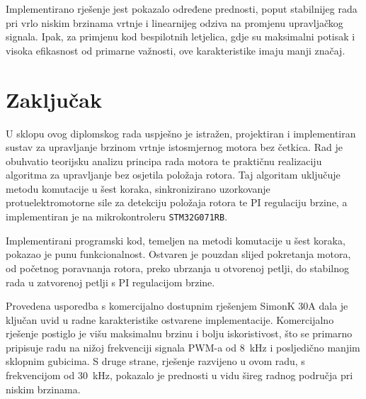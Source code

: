 \documentclass[diplomskirad, upload]{fer}
\begin{document}
Implementirano rješenje jest pokazalo određene prednosti, poput stabilnijeg
rada pri vrlo niskim brzinama vrtnje i linearnijeg odziva na promjenu
upravljačkog signala. Ipak, za primjenu kod bespilotnih letjelica, gdje su
maksimalni potisak i visoka efikasnost od primarne važnosti, ove karakteristike
imaju manji značaj.


%


%


\chapter{Zaključak}
\label{pog:zakljucak}

U sklopu ovog diplomskog rada uspješno je istražen, projektiran i implementiran
sustav za upravljanje brzinom vrtnje istosmjernog motora bez četkica. Rad je
obuhvatio teorijsku analizu principa rada motora te praktičnu realizaciju
algoritma za upravljanje bez osjetila položaja rotora. Taj algoritam uključuje
metodu komutacije u šest koraka, sinkronizirano uzorkovanje protuelektromotorne
sile za detekciju položaja rotora te PI regulaciju brzine, a implementiran je
na mikrokontroleru \texttt{STM32G071RB}.

Implementirani programski kod, temeljen na metodi komutacije u šest koraka,
pokazao je punu funkcionalnost. Ostvaren je pouzdan slijed pokretanja motora,
od početnog poravnanja rotora, preko ubrzanja u otvorenoj petlji, do stabilnog
rada u zatvorenoj petlji s PI regulacijom brzine.

Provedena usporedba s komercijalno dostupnim rješenjem SimonK 30A dala je
ključan uvid u radne karakteristike ostvarene implementacije. Komercijalno
rješenje postiglo je višu maksimalnu brzinu i bolju iskoristivost, što se
primarno pripisuje radu na nižoj frekvenciji signala PWM-a od
\SI{8}{\kilo\hertz} i posljedično manjim sklopnim gubicima. S druge strane,
rješenje razvijeno u ovom radu, s frekvencijom od \SI{30}{\kilo\hertz},
pokazalo je prednosti u vidu šireg radnog područja pri niskim brzinama.
\end{document}
